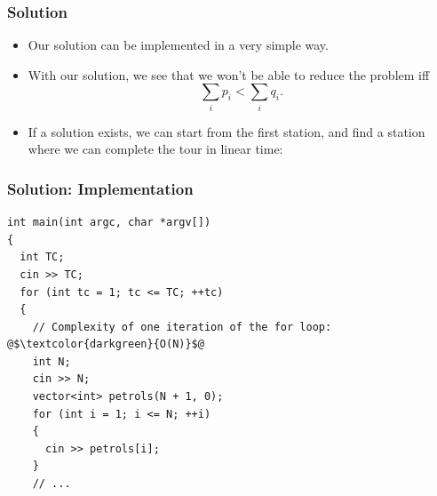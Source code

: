 \documentclass{beamer}
\begin{document}
\begin{frame}%
\frametitle{Solution}


\begin{itemize}

\item Our solution can be implemented in a very simple way.

\vspace{0.2cm}

\item<2-> With our solution, we see that we won't be able to reduce the problem iff
$$
\sum_i p_i < \sum_i q_i.
$$

\vspace{0.1cm}

\item<3-> If a solution exists, we can start from the first station, and find a station where we can complete the tour in linear time:


\end{itemize}

\end{frame}


\begin{frame}[containsverbatim]
\frametitle{Solution: Implementation}

\scriptsize
\begin{lstlisting}
int main(int argc, char *argv[])
{
  int TC;
  cin >> TC;
  for (int tc = 1; tc <= TC; ++tc)
  {
    // Complexity of one iteration of the for loop: @$\textcolor{darkgreen}{O(N)}$@
    int N;
    cin >> N;
    vector<int> petrols(N + 1, 0);
    for (int i = 1; i <= N; ++i)
    {
      cin >> petrols[i];
    }
    // ...
\end{lstlisting}

\end{frame}
\end{document}
